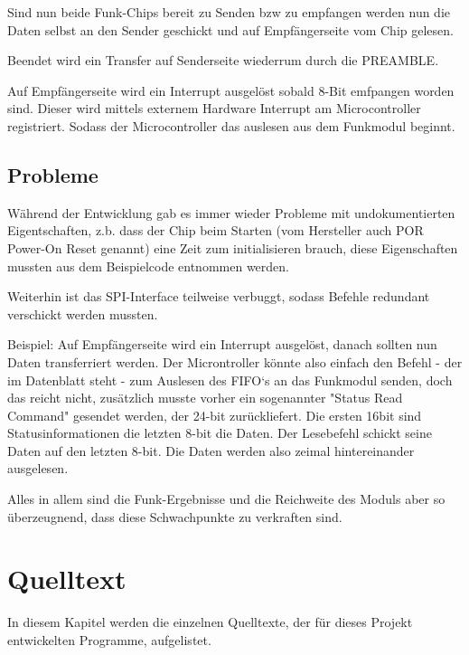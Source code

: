 \documentclass{scrartcl}
\begin{document}
		Sind nun beide Funk-Chips bereit zu Senden bzw zu empfangen werden nun die Daten
		selbst an den Sender geschickt und auf Empfängerseite vom Chip gelesen.

		Beendet wird ein Transfer auf Senderseite wiederrum durch die PREAMBLE.

		Auf Empfängerseite wird ein Interrupt ausgelöst sobald 8-Bit emfpangen worden sind.
		Dieser wird mittels externem Hardware Interrupt am Microcontroller registriert.
		Sodass der Microcontroller das auslesen aus dem Funkmodul beginnt.

	\subsection{Probleme}
		Während der Entwicklung gab es immer wieder Probleme mit undokumentierten Eigentschaften,
		z.b. dass der Chip beim Starten (vom Hersteller auch POR Power-On Reset genannt)
		eine Zeit zum initialisieren brauch, diese Eigenschaften mussten aus dem Beispielcode 
		entnommen werden.
		
		Weiterhin ist das SPI-Interface teilweise verbuggt, sodass Befehle redundant verschickt 
		werden mussten.
		
		Beispiel:
		Auf Empfängerseite wird ein Interrupt ausgelöst, danach sollten nun Daten transferriert werden.
		Der Microntroller könnte also einfach den Befehl - der im Datenblatt steht - zum Auslesen des FIFO`s
		an das Funkmodul senden, doch das reicht nicht, zusätzlich musste vorher ein sogenannter
		"Status Read Command" gesendet werden, der 24-bit zurückliefert. Die ersten 16bit sind
		Statusinformationen die letzten 8-bit die Daten.
		Der Lesebefehl schickt seine Daten auf den letzten 8-bit. 
		Die Daten werden also zeimal hintereinander ausgelesen.
		
		Alles in allem sind die Funk-Ergebnisse und die Reichweite des Moduls aber so überzeugnend, dass
		diese Schwachpunkte zu verkraften sind.

\newpage

\section{Quelltext}
	In diesem Kapitel werden die einzelnen Quelltexte, der für dieses Projekt entwickelten Programme, aufgelistet.

\lstset{language=C}

\end{document}
